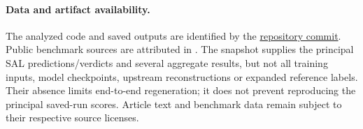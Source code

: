 \paragraph{Data and artifact availability.}
The analyzed code and saved outputs are identified by the
\href{https://github.com/Yazangthb/Gap2Idea/tree/28a6c2dbfad8ad332a66dd11e7b16f74d3ec4267}{repository commit}.
Public benchmark sources are attributed in . The snapshot supplies the principal
SAL predictions/verdicts and several aggregate results, but not all training inputs, model
checkpoints, upstream reconstructions or expanded reference labels. Their absence limits
end-to-end regeneration; it does not prevent reproducing the principal saved-run scores.
Article text and benchmark data remain subject to their respective source licenses.
